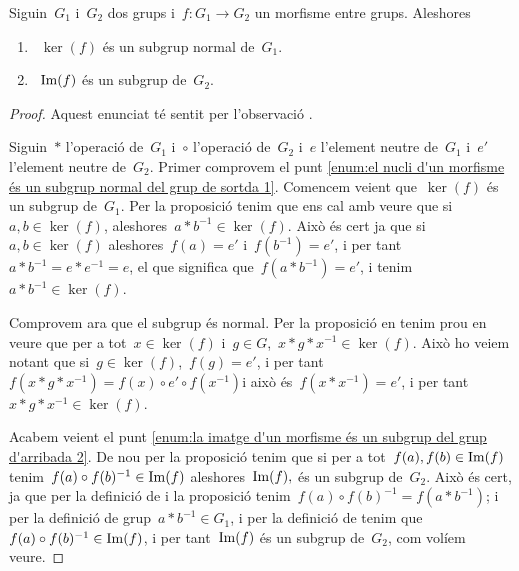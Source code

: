 \documentclass[../../main.tex]{subfiles}
\begin{document}
    \begin{proposition}
        \label{prop:el nucli d'un morfisme és un subgrup normal del grup de sortda}
        \label{prop:la imatge d'un morfisme és un subgrup del grup d'arribada}
        Siguin~\(G_{1}\) i~\(G_{2}\) dos grups i~\(f\colon G_{1}\to G_{2}\) un morfisme entre grups.
        Aleshores
        \begin{enumerate}
            \item\label{enum:el nucli d'un morfisme és un subgrup normal del grup de sortda 1}~\(\ker(f)\) és un subgrup normal de~\(G_{1}\).
            \item\label{enum:la imatge d'un morfisme és un subgrup del grup d'arribada 2}~\(\operatorname{Im}(f)\) és un subgrup de~\(G_{2}\).
        \end{enumerate}
        \begin{proof}
            Aquest enunciat té sentit per l'observació .

            Siguin~\(\ast\) l'operació de~\(G_{1}\) i~\(\circ\) l'operació de~\(G_{2}\) i~\(e\) l'element neutre de~\(G_{1}\) i~\(e'\) l'element neutre de~\(G_{2}\).
            Primer comprovem el punt \eqref{enum:el nucli d'un morfisme és un subgrup normal del grup de sortda 1}.
            Comencem veient que~\(\ker(f)\) és un subgrup de~\(G_{1}\).
            Per la proposició  tenim que ens cal amb veure que si~\(a,b\in\ker(f)\), aleshores~\(a\ast b^{-1}\in\ker(f)\).
            Això és cert ja que si~\(a,b\in\ker(f)\) aleshores~\(f(a)=e'\) i~\(f(b^{-1})=e'\), i per tant~\(a\ast b^{-1}=e\ast e^{-1}=e\), el que significa que~\(f(a\ast b^{-1})=e'\), i tenim~\(a\ast b^{-1}\in\ker(f)\).

            Comprovem ara que el subgrup és normal.
            Per la proposició  en tenim prou en veure que per a tot~\(x\in\ker(f)\) i~\(g\in G\),~\(x\ast g\ast x^{-1}\in\ker(f)\).
            Això ho veiem notant que si~\(g\in\ker(f)\),~\(f(g)=e'\), i per tant~\(f(x\ast g\ast x^{-1})=f(x)\circ e'\circ f(x^{-1})\)i això és~\(f(x\ast x^{-1})=e'\), i per tant~\(x\ast g\ast x^{-1}\in\ker(f)\).

            Acabem veient el punt \eqref{enum:la imatge d'un morfisme és un subgrup del grup d'arribada 2}.
            De nou per la proposició  tenim que si per a tot~\(f(a),f(b)\in\operatorname{Im}(f)\) tenim~\(f(a)\circ f(b)^{-1}\in\operatorname{Im}(f)\) aleshores~\(\operatorname{Im}(f),\) és un subgrup de~\(G_{2}\).
            Això és cert, ja que per la definició de  i la proposició  tenim~\(f(a)\circ f(b)^{-1}=f(a\ast b^{-1})\); i per la definició de grup~\(a\ast b^{-1}\in G_{1}\), i per la definició de  tenim que~\(f(a)\circ f(b)^{-1}\in\operatorname{Im}(f)\), i per tant~\(\operatorname{Im}(f)\) és un subgrup de~\(G_{2}\), com volíem veure.
        \end{proof}
    \end{proposition}
\end{document}

